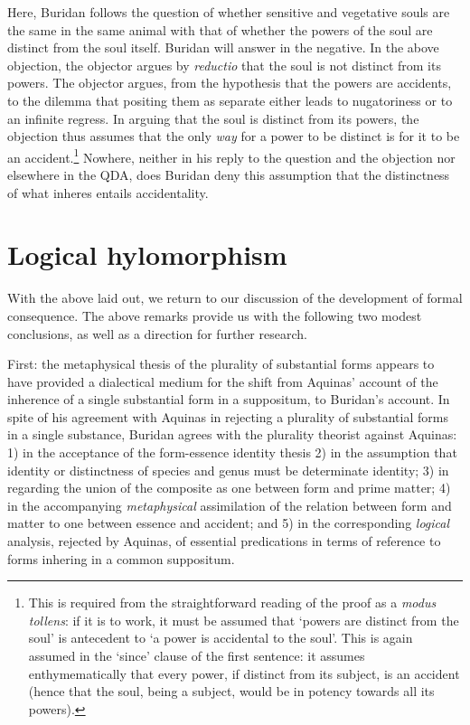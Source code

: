 \documentclass[]{article}
\begin{document}
Here, Buridan follows the question of whether sensitive and vegetative souls are the same in the same animal with that of whether the powers of the soul are distinct from the soul itself. Buridan will answer in the negative. In the above objection, the objector argues by \textit{reductio} that the soul is not distinct from its powers. The objector argues, from the hypothesis that the powers are accidents, to the dilemma that positing them as separate either leads to nugatoriness or to an infinite regress. In arguing that the soul is distinct from its powers, the objection thus assumes that the only \textit{way} for a power to be distinct is for it to be an accident.\footnote{This is required from the straightforward reading of the proof as a \textit{modus tollens}: if it is to work, it must be assumed that `powers are distinct from the soul' is antecedent to `a power is accidental to the soul'. This is again assumed in the `since' clause of the first sentence: it assumes enthymematically that every power, if distinct from its subject, is an accident (hence that the soul, being a subject, would be in potency towards all its powers).} Nowhere, neither in his reply to the question and the objection nor elsewhere in the QDA, does Buridan deny this assumption that the distinctness of what inheres entails accidentality.

\section{Logical hylomorphism}
With the above laid out, we return to our discussion of the development of formal consequence. The above remarks provide us with the following two modest conclusions, as well as a direction for further research. 

First: the metaphysical thesis of the plurality of substantial forms appears to have provided a dialectical medium for the shift from Aquinas' account of the inherence of a single substantial form in a suppositum, to Buridan's account. In spite of his agreement with Aquinas in rejecting a plurality of substantial forms in a single substance, Buridan agrees with the plurality theorist against Aquinas: 1) in the acceptance of the form-essence identity thesis 2) in the assumption that identity or distinctness of species and genus must be determinate identity; 3) in regarding the union of the composite as one between form and prime matter; 4) in the accompanying \textit{metaphysical} assimilation of the relation between form and matter to one between essence and accident; and 5) in the corresponding \textit{logical} analysis, rejected by Aquinas, of essential predications in terms of reference to forms inhering in a common suppositum.
\end{document}
